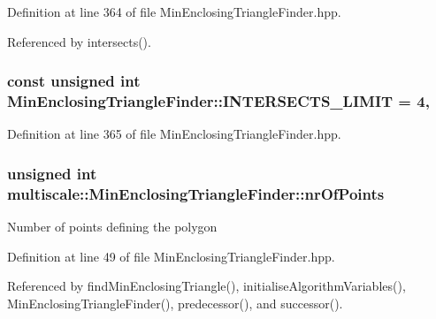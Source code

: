 Definition at line 364 of file Min\-Enclosing\-Triangle\-Finder.\-hpp.



Referenced by intersects().

\hypertarget{classmultiscale_1_1MinEnclosingTriangleFinder_a2d3db503338bc7b70a2e7122eb5b13e3}{
\subsubsection[{I\-N\-T\-E\-R\-S\-E\-C\-T\-S\-\_\-\-L\-I\-M\-I\-T}]{\setlength{\rightskip}{0pt plus 5cm}const unsigned int Min\-Enclosing\-Triangle\-Finder\-::\-I\-N\-T\-E\-R\-S\-E\-C\-T\-S\-\_\-\-L\-I\-M\-I\-T = 4\hspace{0.3cm}{\ttfamily [static]}, {\ttfamily [private]}}}\label{classmultiscale_1_1MinEnclosingTriangleFinder_a2d3db503338bc7b70a2e7122eb5b13e3}


Definition at line 365 of file Min\-Enclosing\-Triangle\-Finder.\-hpp.

\hypertarget{classmultiscale_1_1MinEnclosingTriangleFinder_a92409868a6731f5e41878085f3ac0f73}{
\subsubsection[{nr\-Of\-Points}]{\setlength{\rightskip}{0pt plus 5cm}unsigned int multiscale\-::\-Min\-Enclosing\-Triangle\-Finder\-::nr\-Of\-Points\hspace{0.3cm}{\ttfamily [private]}}}\label{classmultiscale_1_1MinEnclosingTriangleFinder_a92409868a6731f5e41878085f3ac0f73}
Number of points defining the polygon 

Definition at line 49 of file Min\-Enclosing\-Triangle\-Finder.\-hpp.



Referenced by find\-Min\-Enclosing\-Triangle(), initialise\-Algorithm\-Variables(), Min\-Enclosing\-Triangle\-Finder(), predecessor(), and successor().

